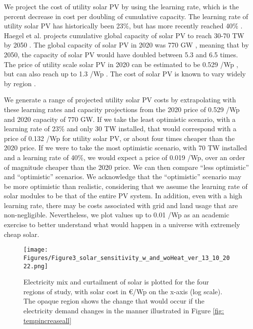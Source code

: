 \documentclass[lettersize,journal]{IEEEtran}
\begin{document}
We project the cost of utility solar PV by using the learning rate, which is the percent decrease in cost per doubling of cumulative capacity. The learning rate of utility solar PV has historically been 23\%, but has more recently reached 40\% \cite{victoria_solar_2021}.  Haegel et al. projects 
cumulative global capacity of solar PV to reach 30-70 TW by 2050 \cite{haegel_terawatt-scale_2019}. The global capacity of solar PV in 2020 was 770 GW \cite{IEA_snapshot_2020}, meaning that by 2050, the capacity of solar PV would have doubled between 5.3 and 6.5 times. The price of utility scale solar PV in 2020 can be estimated to be 0.529 \texteuro/Wp \cite{IEA_snapshot_2020}, but can also reach up to 1.3 \texteuro/Wp \cite{vimmerstedt_2021_2021}. The cost of solar PV is known to vary widely by region \cite{IRENA}.

We generate a range of projected utility solar PV costs by extrapolating with these learning rates and capacity projections from the 2020 price of 0.529 \texteuro/Wp and 2020 capacity of 770 GW. If we take the least optimistic scenario, with a learning rate of 23\% and only 30 TW installed, that would correspond with a price of 0.132 \texteuro/Wp for utility solar PV, or about four times cheaper than the 2020 price. If we were to take the most optimistic scenario, with 70 TW installed and a learning rate of 40\%, we would expect a price of 0.019 \texteuro/Wp, over an order of magnitude cheaper than the 2020 price. We can then compare ``less optimistic” and ``optimistic” scenarios. We acknowledge that the ``optimistic” scenario may be more optimistic than realistic, considering that we assume the learning rate of solar modules to be that of the entire PV system. In addition, even with a high learning rate, there may be costs associated with grid and land usage that are non-negligible. Nevertheless, we plot values up to 0.01 \texteuro/Wp as an academic exercise to better understand what would happen in a universe with extremely cheap solar.







\begin{figure}[H]
\centering
\texttt{[image: Figures/Figure3\_solar\_sensitivity\_w\_and\_woHeat\_ver\_13\_10\_2022.png]}
\caption{Electricity mix and curtailment of solar is plotted for the four regions of study, with solar cost in €/Wp on the x-axis (log scale). The opaque region shows the change that would occur if the electricity demand changes in the manner illustrated in Figure \ref{fig: tempincreaseall}} 
\label{fig: solar_temp_cooling} 
\end{figure}
\end{document}

